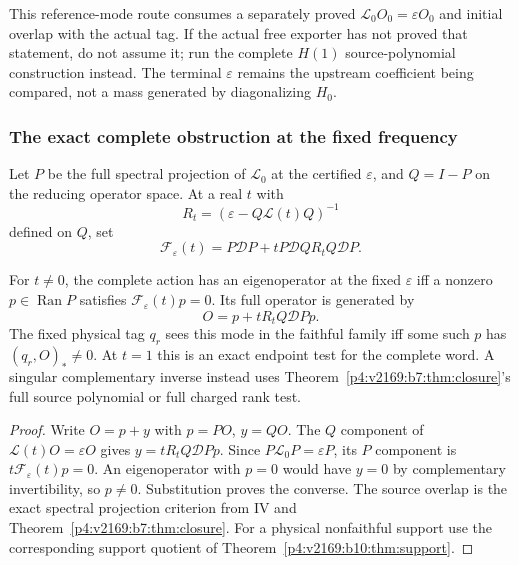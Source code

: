\documentclass[11pt,a4paper]{article}
\begin{document}
This reference-mode route consumes a separately proved
$\mathcal L_0O_0=\varepsilon O_0$ and initial overlap with the actual tag.
If the actual free exporter has not proved that statement, do not assume it;
run the complete $H(1)$ source-polynomial construction instead. The terminal
$\varepsilon$ remains the upstream coefficient being compared, not a mass
generated by diagonalizing $H_0$.

\subsubsection{The exact complete obstruction at the fixed frequency}
Let $P$ be the full spectral projection of $\mathcal L_0$ at the certified
$\varepsilon$, and $Q=I-P$ on the reducing operator space. At a real $t$ with
\[
 R_t=(\varepsilon-Q\mathcal L(t)Q)^{-1}
\]
defined on $Q$, set
\begin{equation}
 \boxed{\mathcal F_\varepsilon(t)
 =P\mathcal DP+tP\mathcal DQ R_t Q\mathcal DP.}
 \label{p3f:eq:v2169-b9-t1}
\end{equation}

\begin{theorem}
\label{p3f:v2169:b9:thm:obstruction}
For $t\ne0$, the complete action has an eigenoperator at the fixed
$\varepsilon$ iff a nonzero $p\in\operatorname{Ran}P$ satisfies
$\mathcal F_\varepsilon(t)p=0$. Its full operator is generated by
\begin{equation}
 \boxed{O=p+tR_tQ\mathcal DPp.}
 \label{p3f:eq:v2169-b9-t2}
\end{equation}
The fixed physical tag $q_r$ sees this mode in the faithful family iff
some such $p$ has $(q_r,O)_*\ne0$. At $t=1$ this is an exact endpoint test
for the complete word. A singular complementary inverse instead uses
Theorem~\ref{p4:v2169:b7:thm:closure}'s full source polynomial or full charged rank test.
\end{theorem}
\begin{proof}
Write $O=p+y$ with $p=PO$, $y=QO$. The $Q$ component of
$\mathcal L(t)O=\varepsilon O$ gives
$y=tR_tQ\mathcal DPp$. Since $P\mathcal L_0P=\varepsilon P$, its
$P$ component is $t\mathcal F_\varepsilon(t)p=0$. An eigenoperator with
$p=0$ would have $y=0$ by complementary invertibility, so $p\ne0$.
Substitution proves the converse. The source overlap is the exact
spectral projection criterion from IV and Theorem~\ref{p4:v2169:b7:thm:closure}. For a physical
nonfaithful support use the corresponding support quotient of Theorem~\ref{p4:v2169:b10:thm:support}.
\end{proof}
\end{document}
